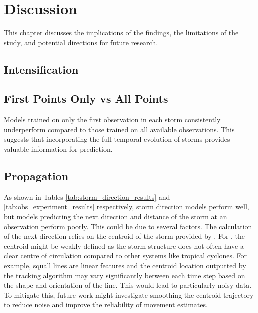 \chapter{Discussion}
\label{ch:discuss}

This chapter discusses the implications of the findings, the limitations of the study, and potential directions for future research.

\section{Intensification}


\section{First Points Only vs All Points}

Models trained on only the first observation in each storm consistently underperform compared to those trained on all available observations. This suggests that incorporating the full temporal evolution of storms provides valuable information for prediction. 

\section{Propagation}

As shown in Tables \ref{tab:storm_direction_results} and \ref{tab:obs_experiment_results} respectively, storm direction models perform well, but models predicting the next direction and distance of the storm at an observation perform poorly. This could be due to several factors. The calculation of the next direction relies on the centroid of the storm provided by \cite{Hill2023}. For , the centroid might be weakly defined as the storm structure does not often have a clear centre of circulation compared to other systems like tropical cyclones. For example, squall lines are linear features and the centroid location outputted by the tracking algorithm may vary significantly between each time step based on the shape and orientation of the line. This would lead to particularly noisy data. To mitigate this, future work might investigate smoothing the centroid trajectory to reduce noise and improve the reliability of movement estimates. 

